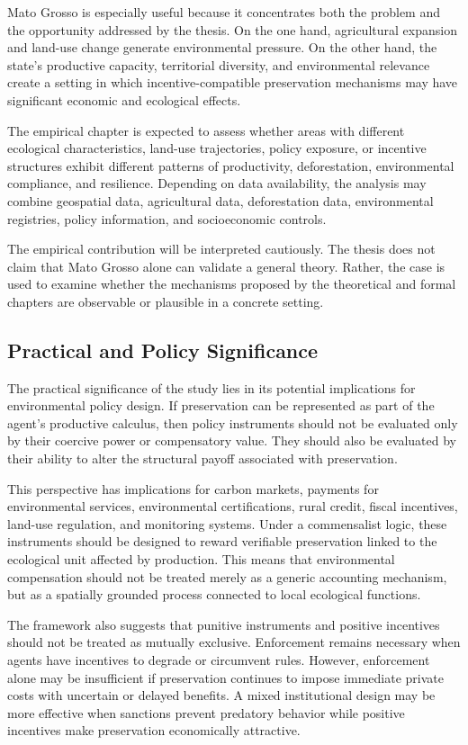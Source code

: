 Mato Grosso is especially useful because it concentrates both the problem and the opportunity addressed by the thesis. On the one hand, agricultural expansion and land-use change generate environmental pressure. On the other hand, the state's productive capacity, territorial diversity, and environmental relevance create a setting in which incentive-compatible preservation mechanisms may have significant economic and ecological effects.

The empirical chapter is expected to assess whether areas with different ecological characteristics, land-use trajectories, policy exposure, or incentive structures exhibit different patterns of productivity, deforestation, environmental compliance, and resilience. Depending on data availability, the analysis may combine geospatial data, agricultural data, deforestation data, environmental registries, policy information, and socioeconomic controls.

The empirical contribution will be interpreted cautiously. The thesis does not claim that Mato Grosso alone can validate a general theory. Rather, the case is used to examine whether the mechanisms proposed by the theoretical and formal chapters are observable or plausible in a concrete setting.

\subsection{Practical and Policy Significance}

The practical significance of the study lies in its potential implications for environmental policy design. If preservation can be represented as part of the agent's productive calculus, then policy instruments should not be evaluated only by their coercive power or compensatory value. They should also be evaluated by their ability to alter the structural payoff associated with preservation.

This perspective has implications for carbon markets, payments for environmental services, environmental certifications, rural credit, fiscal incentives, land-use regulation, and monitoring systems. Under a commensalist logic, these instruments should be designed to reward verifiable preservation linked to the ecological unit affected by production. This means that environmental compensation should not be treated merely as a generic accounting mechanism, but as a spatially grounded process connected to local ecological functions.

The framework also suggests that punitive instruments and positive incentives should not be treated as mutually exclusive. Enforcement remains necessary when agents have incentives to degrade or circumvent rules. However, enforcement alone may be insufficient if preservation continues to impose immediate private costs with uncertain or delayed benefits. A mixed institutional design may be more effective when sanctions prevent predatory behavior while positive incentives make preservation economically attractive.

